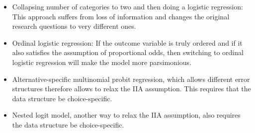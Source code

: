 \begin{frame}[fragile]
\begin{itemize}
\item Collapsing number of categories to two and then doing a logistic regression: This approach suffers from loss of information and changes the original research questions to very different ones. 
\item Ordinal logistic regression: If the outcome variable is truly ordered and if it also satisfies the assumption of proportional odds, then switching to ordinal logistic regression will make the model more parsimonious.
\item Alternative-specific multinomial probit regression, which allows different error structures therefore allows to relax the IIA assumption. This requires that the data structure be choice-specific.
\item Nested logit model, another way to relax the IIA assumption, also requires the data structure be choice-specific. 
\end{itemize}
\end{frame}

